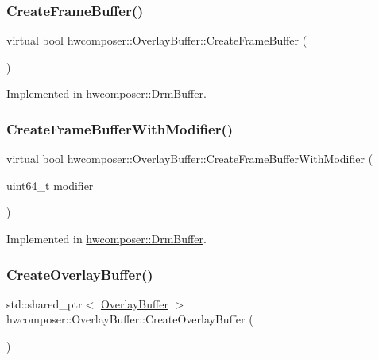 \subsubsection{\texorpdfstring{Create\+Frame\+Buffer()}{CreateFrameBuffer()}}
{\footnotesize\ttfamily virtual bool hwcomposer\+::\+Overlay\+Buffer\+::\+Create\+Frame\+Buffer (\begin{DoxyParamCaption}{ }\end{DoxyParamCaption})\hspace{0.3cm}{\ttfamily [pure virtual]}}



Implemented in \mbox{\hyperlink{classhwcomposer_1_1DrmBuffer_af80ec38c8f6728e9448a9593e08ecf4b}{hwcomposer\+::\+Drm\+Buffer}}.

\mbox{\label{classhwcomposer_1_1OverlayBuffer_ab7f56dcd75f7724d8b1b2ca384f91312}} 
\subsubsection{\texorpdfstring{Create\+Frame\+Buffer\+With\+Modifier()}{CreateFrameBufferWithModifier()}}
{\footnotesize\ttfamily virtual bool hwcomposer\+::\+Overlay\+Buffer\+::\+Create\+Frame\+Buffer\+With\+Modifier (\begin{DoxyParamCaption}\item[{uint64\+\_\+t}]{modifier }\end{DoxyParamCaption})\hspace{0.3cm}{\ttfamily [pure virtual]}}



Implemented in \mbox{\hyperlink{classhwcomposer_1_1DrmBuffer_a3055296aa0dc5fb96553c62217d0f08d}{hwcomposer\+::\+Drm\+Buffer}}.

\mbox{\label{classhwcomposer_1_1OverlayBuffer_a65693ce2be4d207ae036175a89fb66dc}} 
\subsubsection{\texorpdfstring{Create\+Overlay\+Buffer()}{CreateOverlayBuffer()}}
{\footnotesize\ttfamily std\+::shared\+\_\+ptr$<$ \mbox{\hyperlink{classhwcomposer_1_1OverlayBuffer}{Overlay\+Buffer}} $>$ hwcomposer\+::\+Overlay\+Buffer\+::\+Create\+Overlay\+Buffer (\begin{DoxyParamCaption}{ }\end{DoxyParamCaption})\hspace{0.3cm}{\ttfamily [static]}}



